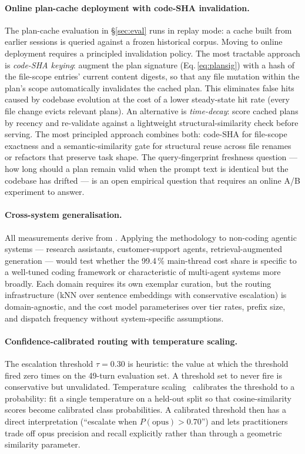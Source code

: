 \paragraph{Online plan-cache deployment with code-SHA invalidation.}
The plan-cache evaluation in §\ref{sec:eval} runs in replay mode: a cache built from earlier sessions is queried against a frozen historical corpus. Moving to online deployment requires a principled invalidation policy. The most tractable approach is \emph{code-SHA keying}: augment the plan signature (Eq.\,\ref{eq:plansig}) with a hash of the file-scope entries' current content digests, so that any file mutation within the plan's scope automatically invalidates the cached plan. This eliminates false hits caused by codebase evolution at the cost of a lower steady-state hit rate (every file change evicts relevant plans). An alternative is \emph{time-decay}: score cached plans by recency and re-validate against a lightweight structural-similarity check before serving. The most principled approach combines both: code-SHA for file-scope exactness and a semantic-similarity gate for structural reuse across file renames or refactors that preserve task shape. The query-fingerprint freshness question --- how long should a plan remain valid when the prompt text is identical but the codebase has drifted --- is an open empirical question that requires an online A/B experiment to answer.

\paragraph{Cross-system generalisation.}
All measurements derive from \blackrim. Applying the methodology to non-coding agentic systems --- research assistants, customer-support agents, retrieval-augmented generation --- would test whether the 99.4\,\% main-thread cost share is specific to a well-tuned coding framework or characteristic of multi-agent systems more broadly. Each domain requires its own exemplar curation, but the routing infrastructure (kNN over sentence embeddings with conservative escalation) is domain-agnostic, and the cost model parameterises over tier rates, prefix size, and dispatch frequency without system-specific assumptions.

\paragraph{Confidence-calibrated routing with temperature scaling.}
The escalation threshold $\tau = 0.30$ is heuristic: the value at which the threshold fired zero times on the 49-turn evaluation set. A threshold set to never fire is conservative but unvalidated. Temperature scaling~\cite{hybridllm} calibrates the threshold to a probability: fit a single temperature on a held-out split so that cosine-similarity scores become calibrated class probabilities. A calibrated threshold then has a direct interpretation (``escalate when $P(\text{opus}) > 0.70$'') and lets practitioners trade off opus precision and recall explicitly rather than through a geometric similarity parameter.

